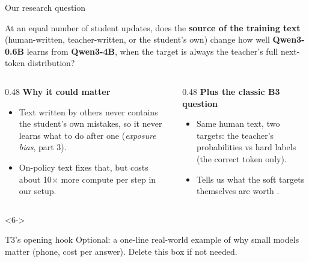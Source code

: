 \begin{frame}{Our research question\hfill{}}
  \begin{keybox}
    At an equal number of student updates, does the \textbf{source of the
    training text} (human-written, teacher-written, or the student's own)
    change how well \textbf{Qwen3-0.6B} learns from \textbf{Qwen3-4B}, when the
    target is always the teacher's full next-token distribution?
  \end{keybox}
  \vspace{0.2cm}
  \begin{columns}[T]
    \begin{column}{0.48\textwidth}
      \small
      \textbf{Why it could matter}
      \begin{itemize}
        \item<2-> Text written by others never contains the student's own
              mistakes, so it never learns what to do after one
              (\emph{exposure bias}, part 3).
        \item<3-> On-policy text fixes that, but costs about 10$\times$ more
              compute per step in our setup.
      \end{itemize}
    \end{column}
    \begin{column}{0.48\textwidth}
      \small
      \textbf{Plus the classic B3 question}
      \begin{itemize}
        \item<4-> Same human text, two targets: the teacher's
              probabilities vs hard labels (the correct token only).
        \item<5-> Tells us what the soft targets themselves are worth
              .
      \end{itemize}
    \end{column}
  \end{columns}
  \vspace{0.15cm}
  \begin{uncoverenv}<6->
  \begin{todobox}{T3's opening hook}
    Optional: a one-line real-world example of why small models matter
    (phone, cost per answer). Delete this box if not needed.
  \end{todobox}
  \end{uncoverenv}
\end{frame}
